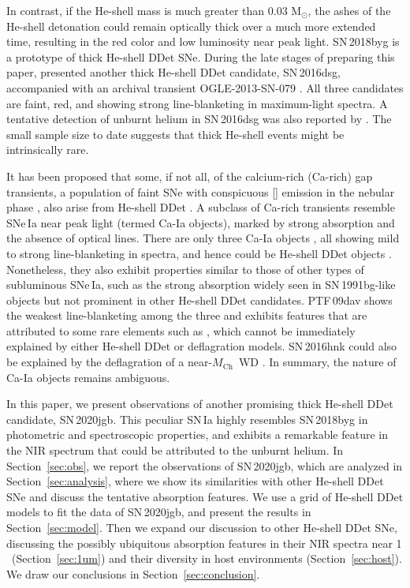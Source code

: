 \documentclass[twocolumn]{aastex631}
\newcommand{\sn}{SN\,2020jgb}
\newcommand{\Mch}{$M_\mathrm{Ch}$}
\begin{document}
\begin{CJK*}{UTF8}{gbsn}
In contrast, if the He-shell mass is much greater than 0.03\,$\,\mathrm{M_\odot}$, the ashes of the He-shell detonation could remain optically thick over a much more extended time, resulting in the red color and low luminosity near peak light. SN\,2018byg \citep{de_18byg_2019} is a prototype of thick He-shell DDet SNe. During the late stages of preparing this paper, \citet{Dong_16dsg_2022} presented another thick He-shell DDet candidate, SN\,2016dsg, accompanied with an archival transient OGLE-2013-SN-079 \citep{Inserra_OGLE13_079_2015}. All three candidates are faint, red, and showing strong line-blanketing in maximum-light spectra. A tentative detection of unburnt helium in SN\,2016dsg was also reported by \citet{Dong_16dsg_2022}. The small sample size to date suggests that thick He-shell events might be intrinsically rare.

It has been proposed that some, if not all, of the calcium-rich (Ca-rich) gap transients, a population of faint SNe with conspicuous [] emission in the nebular phase \citep{Filippenko_2003, Kasliwal_2012}, also arise from He-shell DDet \citep{Dessart_2015,de_Ca_rich_2020,polin_nebular_2021}. A subclass of Ca-rich transients resemble SNe\,Ia near peak light (termed Ca-Ia objects), marked by strong  absorption and the absence of optical  lines. There are only three Ca-Ia objects \citep[PTF\,09dav, SN\,2016hnk, and SN\,2019ofm;][]{de_Ca_rich_2020}, all showing mild to strong line-blanketing in spectra, and hence could be He-shell DDet objects \citep[e.g.,][]{jacobson-galan_16hnk_2020}. Nonetheless, they also exhibit properties similar to those of other types of subluminous SNe\,Ia, such as the strong  absorption widely seen in SN\,1991bg-like \citep[91bg-like;][]{Filippenko_91bg_1992} objects  but not prominent in other He-shell DDet candidates. PTF\,09dav shows the weakest line-blanketing among the three and exhibits features that are attributed to some rare elements such as  \citep{Sullivan_2011}, which cannot be immediately explained by either He-shell DDet or deflagration models. SN\,2016hnk could also be explained by the deflagration of a near-\Mch\ WD \citep{galbany_16hnk_2019}. In summary, the nature of Ca-Ia objects remains ambiguous.

In this paper, we present observations of another promising thick He-shell DDet candidate, \sn. This peculiar SN\,Ia highly resembles SN\,2018byg in photometric and spectroscopic properties, and exhibits a remarkable feature in the NIR spectrum that could be attributed to the unburnt helium. In Section~\ref{sec:obs}, we report the observations of \sn, which are analyzed in Section~\ref{sec:analysis}, where we show its similarities with other He-shell DDet SNe and discuss the tentative  absorption features. We use a grid of He-shell DDet models to fit the data of \sn, and present the results in Section~\ref{sec:model}. Then we expand our discussion to other He-shell DDet SNe, discussing the possibly ubiquitous absorption features in their NIR spectra near 1\,\micron\ (Section~\ref{sec:1um}) and their diversity in host environments (Section~\ref{sec:host}). We draw our conclusions in Section~\ref{sec:conclusion}.


\end{CJK*}
\end{document}
